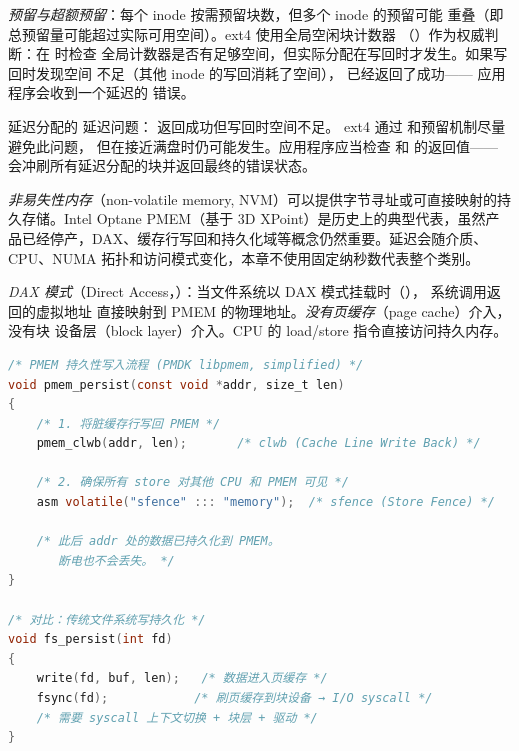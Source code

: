 \begin{filesystemlayout}
\emph{预留与超额预留}：每个 inode 按需预留块数，但多个 inode 的预留可能
重叠（即总预留量可能超过实际可用空间）。ext4 使用全局空闲块计数器
（）作为权威判断：在  时检查
全局计数器是否有足够空间，但实际分配在写回时才发生。如果写回时发现空间
不足（其他 inode 的写回消耗了空间）， 已经返回了成功——
应用程序会收到一个延迟的  错误。

\begin{warningbox}
延迟分配的  延迟问题： 返回成功但写回时空间不足。
ext4 通过  和预留机制尽量避免此问题，
但在接近满盘时仍可能发生。应用程序应当检查  和 
的返回值—— 会冲刷所有延迟分配的块并返回最终的错误状态。
\end{warningbox}


\emph{非易失性内存}（non-volatile memory, NVM）可以提供字节寻址或可直接映射的持久存储。Intel Optane PMEM（基于 3D XPoint）是历史上的典型代表，虽然产品已经停产，DAX、缓存行写回和持久化域等概念仍然重要。延迟会随介质、CPU、NUMA 拓扑和访问模式变化，本章不使用固定纳秒数代表整个类别。

\emph{DAX 模式}（Direct Access，）：当文件系统以 DAX
模式挂载时（）， 系统调用返回的虚拟地址
直接映射到 PMEM 的物理地址。\emph{没有页缓存}（page cache）介入，没有块
设备层（block layer）介入。CPU 的 load/store 指令直接访问持久内存。

\begin{lstlisting}[language=C]
/* PMEM 持久性写入流程 (PMDK libpmem, simplified) */
void pmem_persist(const void *addr, size_t len)
{
    /* 1. 将脏缓存行写回 PMEM */
    pmem_clwb(addr, len);       /* clwb (Cache Line Write Back) */

    /* 2. 确保所有 store 对其他 CPU 和 PMEM 可见 */
    asm volatile("sfence" ::: "memory");  /* sfence (Store Fence) */

    /* 此后 addr 处的数据已持久化到 PMEM。
       断电也不会丢失。 */
}

/* 对比：传统文件系统写持久化 */
void fs_persist(int fd)
{
    write(fd, buf, len);   /* 数据进入页缓存 */
    fsync(fd);            /* 刷页缓存到块设备 → I/O syscall */
    /* 需要 syscall 上下文切换 + 块层 + 驱动 */
}
\end{lstlisting}


\end{filesystemlayout}
